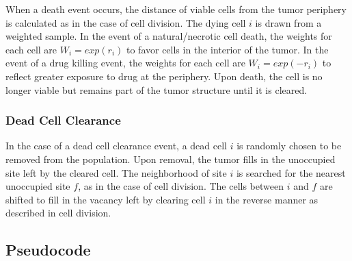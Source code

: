 \documentclass{article}
\begin{document}
When a death event occurs, the distance of viable cells from the tumor periphery is calculated as in the case of cell division.  The dying cell $i$ is drawn from a weighted sample.  In the event of a natural/necrotic cell death, the weights for each cell are $W_i=exp(r_i)$ to favor cells in the interior of the tumor.  In the event of a drug killing event, the weights for each cell are $W_i=exp(-r_i)$ to reflect greater exposure to drug at the periphery.  Upon death, the cell is no longer viable but remains part of the tumor structure until it is cleared.

\subsubsection{Dead Cell Clearance}

In the case of a dead cell clearance event, a dead cell $i$ is randomly chosen to be removed from the population.  Upon removal, the tumor fills in the unoccupied site left by the cleared cell.  The neighborhood of site $i$ is searched for the nearest unoccupied site $f$, as in the case of cell division.  The cells between $i$ and $f$ are shifted to fill in the vacancy left by clearing cell $i$ in the reverse manner as described in cell division.

\subsection{Pseudocode}
\end{document}
